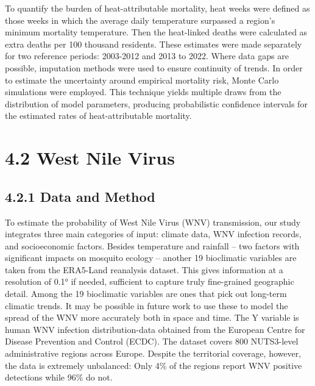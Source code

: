 \documentclass[
]{krantz}
\begin{document}
To quantify the burden of heat-attributable mortality, heat weeks were defined as those weeks in which the average daily temperature surpassed a region's minimum mortality temperature. Then the heat-linked deaths were calculated as extra deaths per 100 thousand residents. These estimates were made separately for two reference periods: 2003-2012 and 2013 to 2022. Where data gaps are possible, imputation methods were used to ensure continuity of trends. In order to estimate the uncertainty around empirical mortality risk, Monte Carlo simulations were employed. This technique yields multiple draws from the distribution of model parameters, producing probabilistic confidence intervals for the estimated rates of heat-attributable mortality.

\section{4.2 West Nile Virus}\label{west-nile-virus}

\subsection{4.2.1 Data and Method}\label{data-and-method}

To estimate the probability of West Nile Virus (WNV) transmission, our study integrates three main categories of input: climate data, WNV infection records, and socioeconomic factors. Besides temperature and rainfall -- two factors with significant impacts on mosquito ecology -- another 19 bioclimatic variables are taken from the ERA5-Land reanalysis dataset. This gives information at a resolution of 0.1° if needed, sufficient to capture truly fine-grained geographic detail. Among the 19 bioclimatic variables are ones that pick out long-term climatic trends. It may be possible in future work to use these to model the spread of the WNV more accurately both in space and time. The Y variable is human WNV infection distribution-data obtained from the European Centre for Disease Prevention and Control (ECDC). The dataset covers 800 NUTS3-level administrative regions across Europe. Despite the territorial coverage, however, the data is extremely unbalanced: Only 4\% of the regions report WNV positive detections while 96\% do not.
\end{document}
